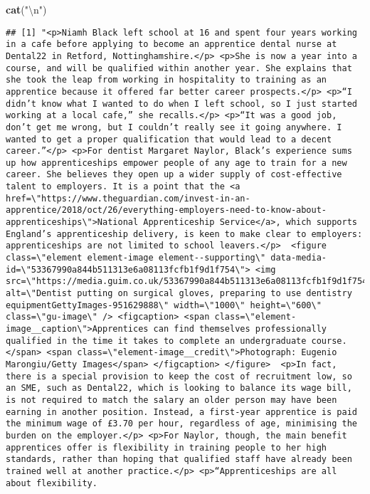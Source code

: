 \documentclass[]{article}
\newenvironment{Shaded}{\begin{snugshade}}{\end{snugshade}}
\newcommand{\KeywordTok}[1]{\textcolor[rgb]{0.13,0.29,0.53}{\textbf{#1}}}
\newcommand{\DecValTok}[1]{\textcolor[rgb]{0.00,0.00,0.81}{#1}}
\newcommand{\CharTok}[1]{\textcolor[rgb]{0.31,0.60,0.02}{#1}}
\newcommand{\StringTok}[1]{\textcolor[rgb]{0.31,0.60,0.02}{#1}}
\newcommand{\OperatorTok}[1]{\textcolor[rgb]{0.81,0.36,0.00}{\textbf{#1}}}
\newcommand{\NormalTok}[1]{#1}
\begin{document}
\begin{Shaded}
\begin{Highlighting}[]
\KeywordTok{cat}\NormalTok{(}\StringTok{"}\CharTok{\textbackslash{}n}\StringTok{"}\NormalTok{)}
\end{Highlighting}
\end{Shaded}

\begin{Shaded}
\end{Shaded}

\begin{verbatim}
## [1] "<p>Niamh Black left school at 16 and spent four years working in a cafe before applying to become an apprentice dental nurse at Dental22 in Retford, Nottinghamshire.</p> <p>She is now a year into a course, and will be qualified within another year. She explains that she took the leap from working in hospitality to training as an apprentice because it offered far better career prospects.</p> <p>“I didn’t know what I wanted to do when I left school, so I just started working at a local cafe,” she recalls.</p> <p>“It was a good job, don’t get me wrong, but I couldn’t really see it going anywhere. I wanted to get a proper qualification that would lead to a decent career.”</p> <p>For dentist Margaret Naylor, Black’s experience sums up how apprenticeships empower people of any age to train for a new career. She believes they open up a wider supply of cost-effective talent to employers. It is a point that the <a href=\"https://www.theguardian.com/invest-in-an-apprentice/2018/oct/26/everything-employers-need-to-know-about-apprenticeships\">National Apprenticeship Service</a>, which supports England’s apprenticeship delivery, is keen to make clear to employers: apprenticeships are not limited to school leavers.</p>  <figure class=\"element element-image element--supporting\" data-media-id=\"53367990a844b511313e6a08113fcfb1f9d1f754\"> <img src=\"https://media.guim.co.uk/53367990a844b511313e6a08113fcfb1f9d1f754/0_0_5600_3360/1000.jpg\" alt=\"Dentist putting on surgical gloves, preparing to use dentistry equipmentGettyImages-951629888\" width=\"1000\" height=\"600\" class=\"gu-image\" /> <figcaption> <span class=\"element-image__caption\">Apprentices can find themselves professionally qualified in the time it takes to complete an undergraduate course.</span> <span class=\"element-image__credit\">Photograph: Eugenio Marongiu/Getty Images</span> </figcaption> </figure>  <p>In fact, there is a special provision to keep the cost of recruitment low, so an SME, such as Dental22, which is looking to balance its wage bill, is not required to match the salary an older person may have been earning in another position. Instead, a first-year apprentice is paid the minimum wage of £3.70 per hour, regardless of age, minimising the burden on the employer.</p> <p>For Naylor, though, the main benefit apprentices offer is flexibility in training people to her high standards, rather than hoping that qualified staff have already been trained well at another practice.</p> <p>“Apprenticeships are all about flexibility. 
\end{verbatim}
\end{document}
